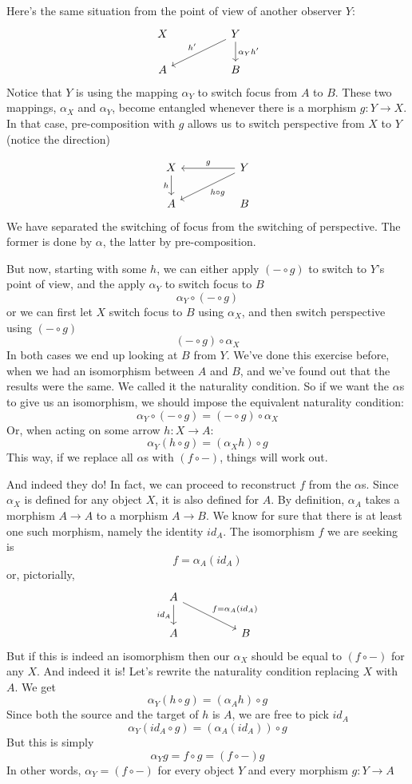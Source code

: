 \documentclass[DaoFP]{subfiles}
\begin{document}
Here's the same situation from the point of view of another observer $Y$:
\[
 \begin{tikzcd}
 X
  && Y
 \arrow[lld, "h'"']
 \arrow[d, "\alpha_Y h'"]
 \\
 A
  && B
 \end{tikzcd}
\]
Notice that $Y$ is using the mapping $\alpha_Y$ to switch focus from $A$ to $B$. These two mappings, $\alpha_X$ and $\alpha_Y$, become entangled whenever there is a morphism $g \colon Y \to X$. In that case, pre-composition with $g$ allows us to switch perspective from $X$ to $Y$ (notice the direction)

\[
 \begin{tikzcd}
 X
 \arrow[d, "h"']
 && Y
 \arrow[ll, "g"']
 \arrow[lld, "h \circ g"]
 \\
 A
  && B
 \end{tikzcd}
\]
We have separated the switching of focus from the switching of perspective. The former is done by $\alpha$, the latter by pre-composition.

But now, starting with some $h$, we can either apply $(- \circ g)$ to switch to $Y$'s point of view, and the apply $\alpha_Y$ to switch focus to $B$
\[ \alpha_Y \circ (- \circ g) \]
or we can first let $X$ switch focus to $B$ using $\alpha_X$, and then switch perspective using $(- \circ g)$
\[ (- \circ g) \circ \alpha_X \]
In both cases we end up looking at $B$ from $Y$. We've done this exercise before, when we had an isomorphism between $A$ and $B$, and we've found out that the results were the same. We called it the naturality condition. So if we want the $\alpha$s to give us an isomorphism, we should impose the equivalent naturality condition:
\[ \alpha_Y \circ (- \circ g) = (- \circ g) \circ \alpha_X \]
Or, when acting on some arrow $h \colon X \to A$:
\[\alpha_Y(h \circ g) = (\alpha_X h) \circ g \]
This way, if we replace all $\alpha$s with $(f \circ -)$, things will work out. 

And indeed they do! In fact, we can proceed to reconstruct $f$ from the $\alpha$s. Since $\alpha_X$ is defined for any object $X$, it is also defined for $A$. By definition, $\alpha_A$ takes a morphism $A \to A$ to a morphism $A \to B$. We know for sure that there is at least one such morphism, namely the identity $id_A$. The isomorphism $f$ we are seeking is
\[f = \alpha_A (id_A)\]
or, pictorially,
\[
 \begin{tikzcd}
 A
 \arrow[d, "id_A"']
 \arrow[rrd, "f = \alpha_A (id_A)"]
  \\
 A
  && B
 \end{tikzcd}
\]
But if this is indeed an isomorphism then our $\alpha_X$ should be equal to  $(f \circ -)$ for any $X$. And indeed it is! Let's rewrite the naturality condition replacing $X$ with $A$. We get
\[\alpha_Y(h \circ g) = (\alpha_A h) \circ g \]
Since both the source and the target of $h$ is $A$, we are free to pick $id_A$
\[\alpha_Y (id_A \circ g) = (\alpha_A (id_A)) \circ g \]
But this is simply
\[\alpha_Y g = f \circ g = (f \circ -) g\]
In other words, $\alpha_Y = (f \circ -)$ for every object $Y$ and every morphism $g \colon Y \to A$
\end{document}
